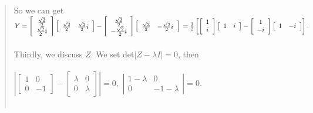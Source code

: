 \documentclass[UTF8]{ctexart}
\begin{document}
\begin{quote}
	So we can get $Y=\left[\begin{array}{c}{\frac{\sqrt{2}}{2}} \\ {\frac{\sqrt{2}}{2} i}\end{array}\right]\left[\begin{array}{cc}{\frac{\sqrt{2}}{2}} & {\frac{\sqrt{2}}{2} i}\end{array}\right]-\left[\begin{array}{c}{\frac{\sqrt{2}}{2}} \\ {-\frac{\sqrt{2}}{2} i}\end{array}\right]\left[\begin{array}{cc}{\frac{\sqrt{2}}{2}} & {-\frac{\sqrt{2}}{2} i}\end{array}\right]\\ \\=\frac{1}{2}\left[\left[\begin{array}{c}{1} \\ {i}\end{array}\right]\left[\begin{array}{cc}{1} & {i}\end{array}\right]-\left[\begin{array}{c}{1} \\ {-i}\end{array}\right]\left[\begin{array}{cc}{1} & {-i}\end{array}\right]\right].$ \\  \\
	Thirdly, we discuss $Z$. We set det$|Z-\lambda I |=0$, then\\  \\
	$\left |\begin{bmatrix}1&0\\0&-1\end{bmatrix}-\begin{bmatrix}\lambda&0\\0&\lambda\end{bmatrix}\right|=0,$
	$\left|\begin{array}{cccc}1-\lambda&0\\0&-1-\lambda \end{array}\right| =0. $ \\ \\


\end{quote}
\end{document}
